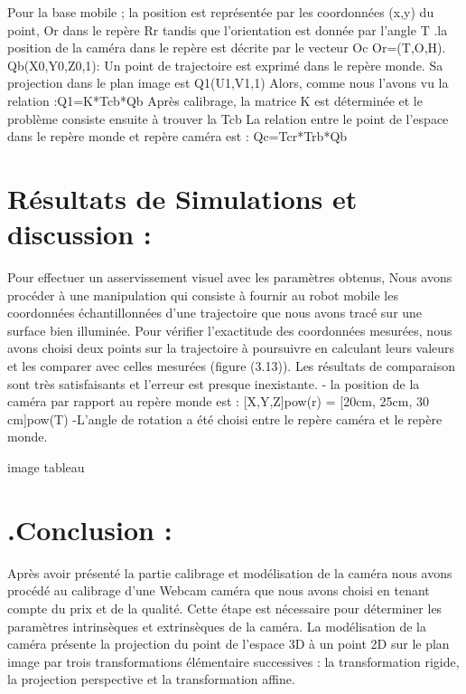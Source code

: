 Pour la base mobile ; la position est représentée par les coordonnées (x,y) du point, Or dans le repère Rr tandis que l'orientation est donnée par l'angle T .la position de la caméra dans le repère est décrite par le vecteur Oc Or=(T,O,H).
Qb(X0,Y0,Z0,1): Un point de trajectoire est exprimé dans le repère monde. Sa projection 
dans le plan image est Q1(U1,V1,1) Alors, comme nous l'avons vu la relation :Q1=K*Tcb*Qb
Après calibrage, la matrice K est déterminée et le problème consiste ensuite à trouver la 
Tcb
La relation entre le point de l'espace dans le repère monde et repère caméra est :
Qc=Tcr*Trb*Qb
\section{Résultats de Simulations et discussion :}
Pour effectuer un asservissement visuel avec les paramètres obtenus, Nous avons 
procéder à une manipulation qui consiste à fournir au robot mobile les coordonnées 
échantillonnées d'une trajectoire que nous avons tracé sur une surface bien illuminée. Pour 
vérifier l'exactitude des coordonnées mesurées, nous avons choisi deux points sur la 
trajectoire à poursuivre en calculant leurs valeurs et les comparer avec celles mesurées (figure 
(3.13)). Les résultats de comparaison sont très satisfaisants et l'erreur est presque inexistante. 
 - la position de la caméra par rapport au repère monde est : 
[X,Y,Z]pow(r) = [20cm, 25cm, 30 cm]pow(T)
 -L'angle de rotation a été choisi entre le repère caméra et le repère monde.

 image tableau 
 \section{.Conclusion :}
 Après avoir présenté la partie calibrage et modélisation de la caméra nous avons procédé 
au calibrage d'une Webcam caméra que nous avons choisi en tenant compte du prix et de la 
qualité. Cette étape est nécessaire pour déterminer les paramètres intrinsèques et extrinsèques 
de la caméra. La modélisation de la caméra présente la projection du point de l'espace 3D à un 
point 2D sur le plan image par trois transformations élémentaire successives : la 
transformation rigide, la projection perspective et la transformation affine.



